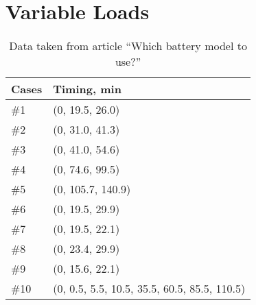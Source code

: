 \chapter{Variable Loads}\label{appendix:VL}

\begin{table}[H]
\centering
\begin{tabular}{|l|l|}
\hline
Cases & Timing, min \\ \hline
\rowcolor[HTML]{EFEFEF} 
\#1 & (0, 19.5, 26.0) \\ \hline
\#2 & (0, 31.0, 41.3) \\ \hline
\rowcolor[HTML]{EFEFEF} 
\#3 & (0, 41.0, 54.6) \\ \hline
\#4 & (0, 74.6, 99.5) \\ \hline
\rowcolor[HTML]{EFEFEF} 
\#5 & (0, 105.7, 140.9) \\ \hline
\#6 & (0, 19.5, 29.9) \\ \hline
\rowcolor[HTML]{EFEFEF} 
\#7 & (0, 19.5, 22.1) \\ \hline
\#8 & (0, 23.4, 29.9) \\ \hline
\rowcolor[HTML]{EFEFEF} 
\#9 & (0, 15.6, 22.1) \\ \hline
\#10 & (0, 0.5, 5.5, 10.5, 35.5, 60.5, 85.5, 110.5) \\ \hline
\end{tabular}
\caption{Data taken from article ``Which battery model to use?''\cite{battery_model}}
\label{table:variable_loads_list}
\end{table}